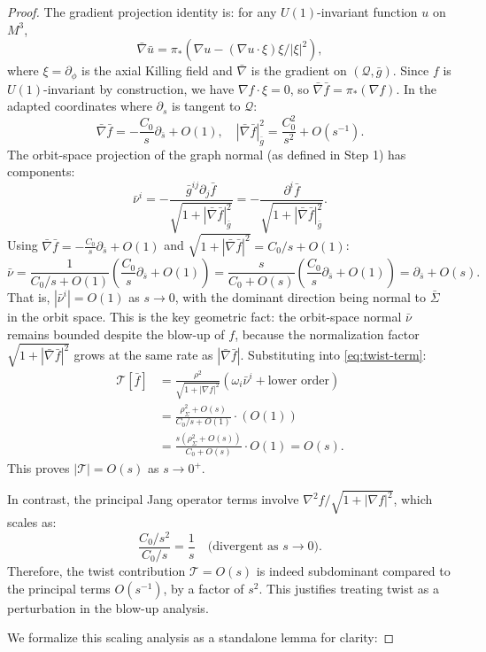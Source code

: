 \begin{proof}
The gradient projection identity is: for any $U(1)$-invariant function $u$ on $M^3$,
\[
\bar{\nabla}\bar{u} = \pi_*(\nabla u - (\nabla u \cdot \xi)\xi/|\xi|^2),
\]
where $\xi = \partial_\phi$ is the axial Killing field and $\bar{\nabla}$ is the gradient on $(\mathcal{Q}, \bar{g})$. Since $f$ is $U(1)$-invariant by construction, we have $\nabla f \cdot \xi = 0$, so $\bar{\nabla}\bar{f} = \pi_*(\nabla f)$. In the adapted coordinates where $\partial_s$ is tangent to $\mathcal{Q}$:
\[
\bar{\nabla}\bar{f} = -\frac{C_0}{s}\partial_{\bar{s}} + O(1), \quad |\bar{\nabla}\bar{f}|^2_{\bar{g}} = \frac{C_0^2}{s^2} + O(s^{-1}).
\]
The orbit-space projection of the graph normal (as defined in Step 1) has components:
\[
\bar{\nu}^i = -\frac{\bar{g}^{ij}\partial_j \bar{f}}{\sqrt{1 + |\bar{\nabla}\bar{f}|^2_{\bar{g}}}} = -\frac{\partial^i \bar{f}}{\sqrt{1 + |\bar{\nabla}\bar{f}|^2_{\bar{g}}}}.
\]
Using $\bar{\nabla}\bar{f} = -\frac{C_0}{s}\partial_{\bar{s}} + O(1)$ and $\sqrt{1 + |\bar{\nabla}\bar{f}|^2} = C_0/s + O(1)$:
\[
\bar{\nu} = \frac{1}{C_0/s + O(1)}\left(\frac{C_0}{s}\partial_{\bar{s}} + O(1)\right) = \frac{s}{C_0 + O(s)}\left(\frac{C_0}{s}\partial_{\bar{s}} + O(1)\right) = \partial_{\bar{s}} + O(s).
\]
That is, $|\bar{\nu}^i| = O(1)$ as $s \to 0$, with the dominant direction being normal to $\bar{\Sigma}$ in the orbit space. This is the key geometric fact: the orbit-space normal $\bar{\nu}$ remains bounded despite the blow-up of $f$, because the normalization factor $\sqrt{1 + |\bar{\nabla}\bar{f}|^2}$ grows at the same rate as $|\bar{\nabla}\bar{f}|$.
Substituting into \eqref{eq:twist-term}:
\begin{align}
\mathcal{T}[\bar{f}] &= \frac{\rho^2}{\sqrt{1 + |\nabla f|^2}} \left( \omega_i \bar{\nu}^i + \text{lower order}\right) \\
&= \frac{\rho_\Sigma^2 + O(s)}{C_0/s + O(1)} \cdot (O(1)) \\
&= \frac{s(\rho_\Sigma^2 + O(s))}{C_0 + O(s)} \cdot O(1) = O(s).
\end{align}
This proves $|\mathcal{T}| = O(s)$ as $s \to 0^+$.

In contrast, the principal Jang operator terms involve $\nabla^2 f / \sqrt{1 + |\nabla f|^2}$, which scales as:
\[
\frac{C_0/s^2}{C_0/s} = \frac{1}{s} \quad \text{(divergent as } s \to 0).
\]
Therefore, the twist contribution $\mathcal{T} = O(s)$ is indeed subdominant compared to the principal terms $O(s^{-1})$, by a factor of $s^2$. This justifies treating twist as a perturbation in the blow-up analysis.

We formalize this scaling analysis as a standalone lemma for clarity:


\end{proof}
